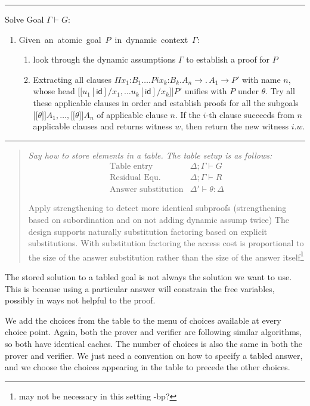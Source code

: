 \documentclass{acmconf}
\newcommand{\figfoot}{\vspace{1ex}\hrule}
\newcommand{\fighead}{\hrule\vspace{1.5ex}}
\newcommand{\ldot}{.\,}
\newcommand{\vd}{\vdash}
\newcommand{\oftp}{\mathord{:}}
\newenvironment{note}{\begin{quote}\message{note!}\it}{\end{quote}}
\newcommand{\lbb}{{[\![}}
\newcommand{\rbb}{{]\!]}}
\newcommand{\id}{\mathsf{id}}
\newcommand{\msub}[1]{\lbb #1 \rbb}
\begin{document}
\fighead
\begin{small}
Solve Goal $\Gamma \vd G$:
\begin{enumerate}
\item \mbox{Given an atomic goal $P$ in dynamic context
    $\Gamma$:}\hfill\\
  \begin{enumerate}
  \item look through the dynamic assumptions $\Gamma$ to establish a proof for $P$ 
  \item Extracting all clauses $\Pi x_1\oftp B_1\ldots.Pi x_k\oftp
    B_k. A_n \rightarrow \ldot A_1 \rightarrow P'$ with name $n$,
    whose head $\msub{u_1[\id]/x_1, \ldots u_k[\id]/x_k}P'$ unifies
    with $P$ under $\theta$. Try all these applicable clauses in
    order and establish proofs for all the subgoals
    $\msub{\theta}A_1, \ldots, \msub{\theta}A_n$ of applicable clause
    $n$. If the $i$-th clause succeeds from $n$ applicable clauses and
    returns witness $w$, then return the new witness $i . w$.
  \end{enumerate}
\end{enumerate}
\end{small}
\figfoot

\begin{note}
  Say how to store elements in a table.
The table setup is as follows:
\[
\begin{array}{ll}
\mbox{Table entry} & \Delta ; \Gamma \vd G\\
\mbox{Residual Equ.} & \Delta ; \Gamma \vd R \\
\mbox{Answer substitution} & \Delta' \vd \theta : \Delta
\end{array}
\]

Apply strengthening to detect more identical subproofs (strengthening
based on subordination and on not adding dynamic assump twice)
The design supports naturally substitution factoring based on explicit
substitutions\cite{RamakrishnanJLP99}. With substitution factoring the
access cost is proportional to the size of the answer substitution
rather than the size of the answer itself\footnote{may not be necessary in
this setting -bp?}
\end{note}

The stored solution to a tabled goal is not always the solution we
want to use.  This is because using a particular answer will constrain
the free variables, possibly in ways not helpful to the proof. 

We add the choices from the table to the menu of choices available at
every choice point. Again, both the prover and verifier are following
similar algorithms, so both have identical caches. The number of
choices is also the same in both the prover and verifier. We just need
a convention on how to specify a tabled answer, and we choose the
choices appearing in the table to precede the other choices.
\end{document}
